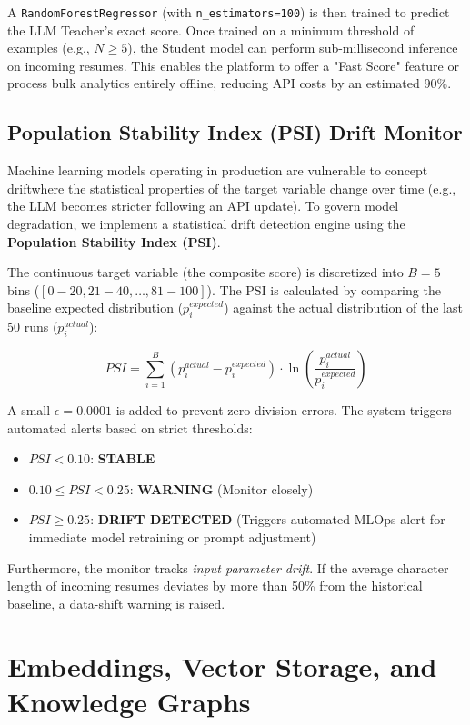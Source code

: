 \documentclass[10pt,journal,compsoc]{IEEEtran}
\begin{document}
A \texttt{RandomForestRegressor} (with \texttt{n\_estimators=100}) is then trained to predict the LLM Teacher's exact score. Once trained on a minimum threshold of examples (e.g., $N \geq 5$), the Student model can perform sub-millisecond inference on incoming resumes. This enables the platform to offer a "Fast Score" feature or process bulk analytics entirely offline, reducing API costs by an estimated 90\%.

\subsection{Population Stability Index (PSI) Drift Monitor}
Machine learning models operating in production are vulnerable to concept driftwhere the statistical properties of the target variable change over time (e.g., the LLM becomes stricter following an API update). To govern model degradation, we implement a statistical drift detection engine using the \textbf{Population Stability Index (PSI)}.

The continuous target variable (the composite score) is discretized into $B=5$ bins ($[0-20, 21-40, \dots, 81-100]$). The PSI is calculated by comparing the baseline expected distribution ($p_i^{expected}$) against the actual distribution of the last 50 runs ($p_i^{actual}$):

\begin{equation}
    PSI = \sum_{i=1}^{B} \left(p_i^{actual} - p_i^{expected}\right) \cdot \ln\left(\frac{p_i^{actual}}{p_i^{expected}}\right)
\end{equation}

A small $\epsilon = 0.0001$ is added to prevent zero-division errors. The system triggers automated alerts based on strict thresholds:
\begin{itemize}
    \item $PSI < 0.10$: \textbf{STABLE}
    \item $0.10 \leq PSI < 0.25$: \textbf{WARNING} (Monitor closely)
    \item $PSI \geq 0.25$: \textbf{DRIFT DETECTED} (Triggers automated MLOps alert for immediate model retraining or prompt adjustment)
\end{itemize}
Furthermore, the monitor tracks \textit{input parameter drift}. If the average character length of incoming resumes deviates by more than 50\% from the historical baseline, a data-shift warning is raised.


\section{Embeddings, Vector Storage, and Knowledge Graphs}\label{sec:embeddings}
\end{document}
